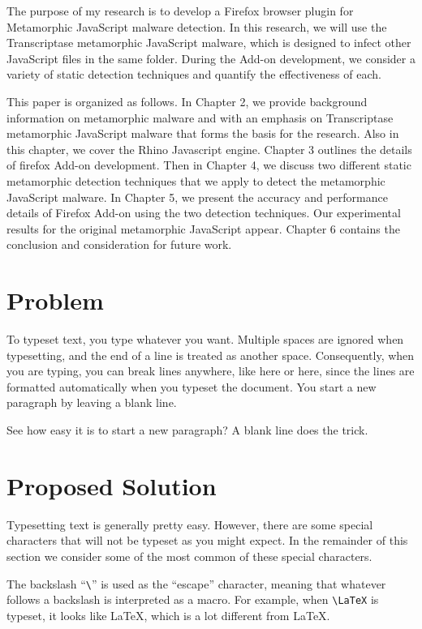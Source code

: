 The purpose of my research is to develop a Firefox browser plugin for Metamorphic JavaScript malware detection. In this research, we will use the Transcriptase metamorphic JavaScript malware, which is designed to infect other JavaScript files in the same folder. During the Add-on development, we consider a variety of static detection techniques and quantify the effectiveness of each. 

This paper is organized as follows. In Chapter 2, we provide background information on metamorphic malware and with an emphasis on Transcriptase metamorphic JavaScript malware that forms the basis for the research. Also in this chapter, we cover the Rhino Javascript engine. Chapter 3 outlines the details of firefox Add-on development. Then in Chapter 4, we discuss two different static metamorphic detection techniques that we apply to detect the metamorphic JavaScript malware. In Chapter 5, we present the accuracy and performance details of Firefox Add-on using the two detection techniques. Our
experimental results for the original metamorphic JavaScript appear. Chapter 6 contains the conclusion and consideration for future work.

\section{Problem} 

To typeset text, you type whatever you want. Multiple spaces are
ignored                           when typesetting, and
the end of a line is treated as another space.
Consequently, when you are typing, you can break lines anywhere, like here
or here,
since the lines are formatted automatically when you typeset the document.
You start a new paragraph by leaving a blank line.

See how easy it is to start a new paragraph? A blank line does the trick.


\section{Proposed Solution}

Typesetting text is generally pretty easy. However, there are some special
characters that will not be typeset as you might expect. In the remainder of this
section we consider some of the most common of these
special characters. 

The backslash ``\verb+\+'' is used 
as the ``escape'' character, meaning that
whatever follows a backslash is interpreted as a macro.
For example, when \verb+\LaTeX+ is typeset, it looks like \LaTeX, which 
is a lot different from LaTeX.

